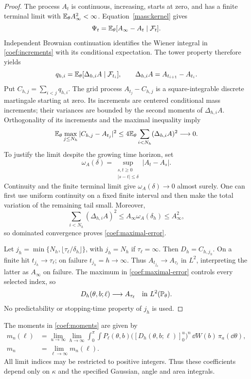 \begin{proof}
The process $A_t$ is continuous,
increasing, starts at zero, and has a finite terminal limit with
$\mathbb E_\theta A_\infty^2<\infty$.  Equation~\eqref{mass:kernel} gives
\[
 \Psi_t=\mathbb E_\theta[A_\infty-A_t\mid\mathcal F_t].
\]
Independent Brownian continuation identifies the Wiener integral in
\eqref{coef:increments} with its conditional expectation.
The tower property therefore yields
\[
 q_{h,i}=\mathbb E_\theta[\Delta_{h,i}A\mid\mathcal F_{t_i}],
 \qquad \Delta_{h,i}A=A_{t_{i+1}}-A_{t_i}.
\]
Put $C_{h,j}=\sum_{i<j}q_{h,i}$.  The grid process
$A_{t_j}-C_{h,j}$ is a square-integrable discrete martingale starting
at zero. Its increments are centered conditional mass increments;
their variances are bounded by the second moments of $\Delta_{h,i}A$.
Orthogonality of its increments and the maximal inequality imply
\begin{equation}
 \mathbb E_\theta\max_{j\le N_h}|C_{h,j}-A_{t_j}|^2
       \le4\mathbb E_\theta\sum_{i<N_h}(\Delta_{h,i}A)^2
       \longrightarrow0.
 \label{coef:maximal-error}
\end{equation}
To justify the limit despite the growing time horizon, set
\[
 \omega_A(\delta)
   =\sup_{\substack{s,t\ge0\\|s-t|\le\delta}}|A_t-A_s|.
\]
Continuity and the finite terminal limit give
$\omega_A(\delta)\to0$ almost surely.  One can first use uniform
continuity on a fixed finite interval and then make the total variation
of the remaining tail small.  Moreover,
\[
 \sum_{i<N_h}(\Delta_{h,i}A)^2
       \le A_\infty\omega_A(\delta_h)\le A_\infty^2,
\]
so dominated convergence proves \eqref{coef:maximal-error}.

Let $j_h=\min\{N_h,\lfloor\tau_\ell/\delta_h\rfloor\}$, with
$j_h=N_h$ if $\tau_\ell=\infty$.  Then $D_h=C_{h,j_h}$.
On a finite hit $t_{j_h}\to\tau_\ell$; on failure $t_{j_h}=h\to\infty$.
Thus $A_{t_{j_h}}\to A_{\tau_\ell}$ in $L^2$, interpreting the latter as
$A_\infty$ on failure.  The maximum in \eqref{coef:maximal-error} controls
every selected index, so
\[
 D_h(\theta,b;\ell)\longrightarrow A_{\tau_\ell}
             \quad\text{in }L^2(\mathbb P_\theta).
\]
No predictability or stopping-time property of $j_h$ is used.

\end{proof}

\begin{proposition}\label{coef:explicit}
The moments in \eqref{coef:moments} are given by
\begin{equation}
 \begin{aligned}
 m_n(\ell)
   &=\lim_{u\to\infty}\lim_{h\to\infty}
       \int_0^\pi\int P_\ell(\theta,b)
       \bigl([D_h(\theta,b;\ell)]_0^u\bigr)^n
       \,\dd W(b)\,\pi_a(\dd\theta),\\
 m_n&=\lim_{\ell\to\infty}m_n(\ell).
 \end{aligned}
 \label{coef:formula}
\end{equation}
All limit indices may be restricted to positive integers.  Thus these
coefficients depend only on $\kappa$ and the specified Gaussian, angle
and area integrals.
\end{proposition}

